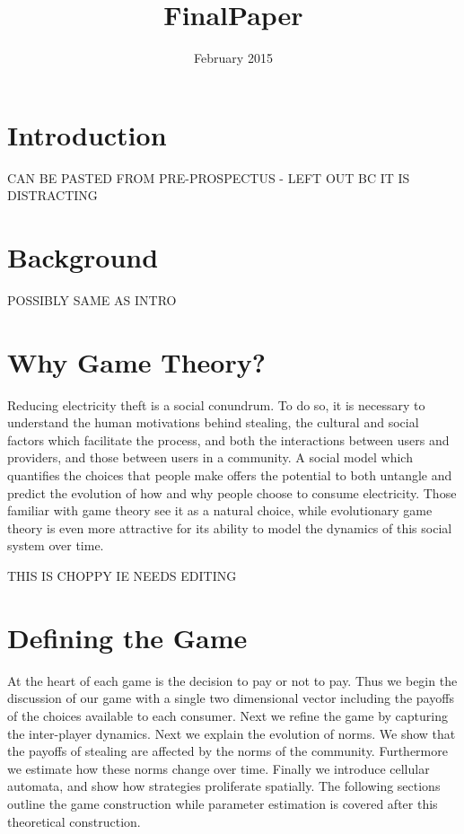 \documentclass{article}
\title{FinalPaper}
\author{ }
\date{February 2015}
\begin{document}
\maketitle

\section{Introduction}
CAN BE PASTED FROM PRE-PROSPECTUS - LEFT OUT BC IT IS DISTRACTING


\section{Background}
POSSIBLY SAME AS INTRO

\section{Why Game Theory?}
Reducing electricity theft is a social conundrum. To do so, it is necessary to understand the human motivations behind stealing, the cultural and social factors which facilitate the process, and both the interactions between users and providers, and those between users in a community. A social model which quantifies the choices that people make offers the potential to both untangle and predict the evolution of how and why people choose to consume electricity. Those familiar with game theory see it as a natural choice, while evolutionary game theory is even more attractive for its ability to model the dynamics of this social system over time. 


THIS IS CHOPPY IE NEEDS EDITING

\section{Defining the Game}
At the heart of each game is the decision to pay or not to pay. Thus we begin the discussion of our game with a single two dimensional vector including the payoffs of the choices available to each consumer. Next we refine the game by capturing the inter-player dynamics. Next we explain the evolution of norms. We show that the payoffs of stealing are affected by the norms of the community. Furthermore we estimate how these norms change over time. Finally we introduce cellular automata, and show how strategies proliferate spatially. The following sections outline the game construction while parameter estimation is covered after this theoretical construction. \\ 
\end{document}
